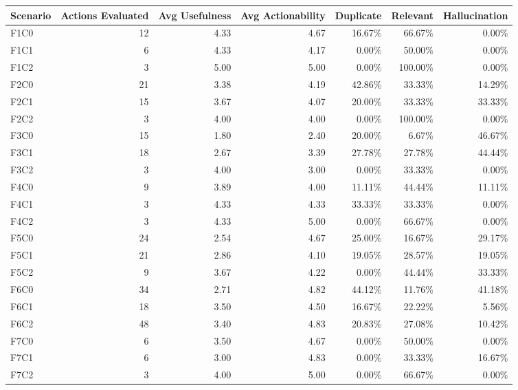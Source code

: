 \begin{tabular}{lrrrrrr}
\toprule
Scenario & Actions Evaluated & Avg Usefulness & Avg Actionability & Duplicate & Relevant & Hallucination \\
\midrule
F1C0 & 12 & 4.33 & 4.67 & 16.67\% & 66.67\% & 0.00\% \\
F1C1 & 6 & 4.33 & 4.17 & 0.00\% & 50.00\% & 0.00\% \\
F1C2 & 3 & 5.00 & 5.00 & 0.00\% & 100.00\% & 0.00\% \\
F2C0 & 21 & 3.38 & 4.19 & 42.86\% & 33.33\% & 14.29\% \\
F2C1 & 15 & 3.67 & 4.07 & 20.00\% & 33.33\% & 33.33\% \\
F2C2 & 3 & 4.00 & 4.00 & 0.00\% & 100.00\% & 0.00\% \\
F3C0 & 15 & 1.80 & 2.40 & 20.00\% & 6.67\% & 46.67\% \\
F3C1 & 18 & 2.67 & 3.39 & 27.78\% & 27.78\% & 44.44\% \\
F3C2 & 3 & 4.00 & 3.00 & 0.00\% & 33.33\% & 0.00\% \\
F4C0 & 9 & 3.89 & 4.00 & 11.11\% & 44.44\% & 11.11\% \\
F4C1 & 3 & 4.33 & 4.33 & 33.33\% & 33.33\% & 0.00\% \\
F4C2 & 3 & 4.33 & 5.00 & 0.00\% & 66.67\% & 0.00\% \\
F5C0 & 24 & 2.54 & 4.67 & 25.00\% & 16.67\% & 29.17\% \\
F5C1 & 21 & 2.86 & 4.10 & 19.05\% & 28.57\% & 19.05\% \\
F5C2 & 9 & 3.67 & 4.22 & 0.00\% & 44.44\% & 33.33\% \\
F6C0 & 34 & 2.71 & 4.82 & 44.12\% & 11.76\% & 41.18\% \\
F6C1 & 18 & 3.50 & 4.50 & 16.67\% & 22.22\% & 5.56\% \\
F6C2 & 48 & 3.40 & 4.83 & 20.83\% & 27.08\% & 10.42\% \\
F7C0 & 6 & 3.50 & 4.67 & 0.00\% & 50.00\% & 0.00\% \\
F7C1 & 6 & 3.00 & 4.83 & 0.00\% & 33.33\% & 16.67\% \\
F7C2 & 3 & 4.00 & 5.00 & 0.00\% & 66.67\% & 0.00\% \\
\bottomrule
\end{tabular}
